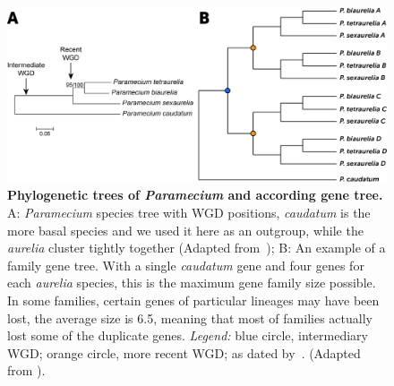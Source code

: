 \documentclass[10pt]{article}
\begin{document}
\begin{figure}[!ht]
\begin{center}
\includegraphics[scale=0.7]{Figures/SpeciesGene.png}
\end{center}
\caption{
{\bf Phylogenetic trees of \textit{Paramecium} and according gene tree.} A: \textit{Paramecium} species tree with WGD positions, \textit{caudatum} is the more basal species and we used it here as an outgroup, while the \textit{aurelia} cluster tightly together (Adapted from~\citealt{mcgrath_insights_2014}); B: An example of a family gene tree. With a single \textit{caudatum} gene and four genes for each \textit{aurelia} species, this is the maximum gene family size possible. In some families, certain genes of particular lineages may have been lost, the average size is 6.5, meaning that most of families actually lost some of the duplicate genes. \textit{Legend:} blue circle, intermediary WGD; orange circle, more recent WGD; as dated by~\citep{aury_global_2006}. (Adapted from \citealt{mcgrath_insights_2014}).
}
\label{fig:DuplicationTree}
\end{figure}
\end{document}
